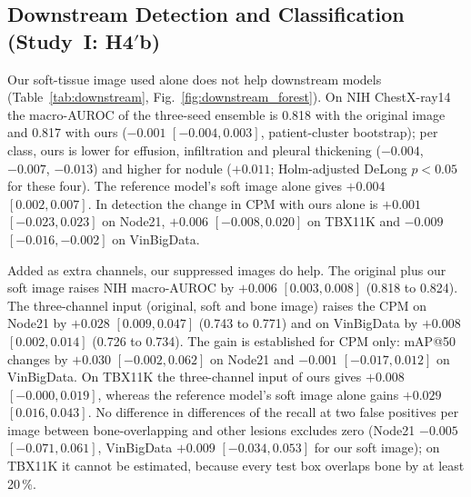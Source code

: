 \begin{table}[!t]
\centering
\caption{Contrast-to-noise change of real nodules on JSRT and Node21 (soft-tissue image minus original), all lesions and lesions with at
least 15\,\% bone overlap; image-cluster bootstrap intervals.}
\label{tab:cnr}
\end{table}

\subsection{Downstream Detection and Classification (Study~I: H4\texorpdfstring{$'$}{'}b)}
\label{sec:res-downstream}
Our soft-tissue image used alone does not help downstream models (Table~\ref{tab:downstream}, Fig.~\ref{fig:downstream_forest}). On
NIH ChestX-ray14 the macro-AUROC of the three-seed ensemble is 0.818 with the original image and 0.817 with ours ($-0.001$
$[-0.004,0.003]$, patient-cluster bootstrap); per class, ours is lower for effusion, infiltration and pleural thickening ($-0.004$,
$-0.007$, $-0.013$) and higher for nodule ($+0.011$; Holm-adjusted DeLong $p<0.05$ for these four). The reference model's soft image alone
gives $+0.004$ $[0.002,0.007]$. In detection the change in CPM with ours alone is $+0.001$ $[-0.023,0.023]$ on Node21, $+0.006$
$[-0.008,0.020]$ on TBX11K and $-0.009$ $[-0.016,-0.002]$ on VinBigData.

Added as extra channels, our suppressed images do help. The original plus our soft image raises NIH macro-AUROC by $+0.006$
$[0.003,0.008]$ (0.818 to 0.824). The three-channel input (original, soft and bone image) raises the CPM on Node21 by $+0.028$
$[0.009,0.047]$ (0.743 to 0.771) and on VinBigData by $+0.008$ $[0.002,0.014]$ (0.726 to 0.734). The gain is established for CPM only:
mAP@50 changes by $+0.030$ $[-0.002,0.062]$ on Node21 and $-0.001$ $[-0.017,0.012]$ on VinBigData. On TBX11K the three-channel input of ours
gives $+0.008$ $[-0.000,0.019]$, whereas the reference model's soft image alone gains $+0.029$ $[0.016,0.043]$. No difference in differences
of the recall at two false positives per image between bone-overlapping and other lesions excludes zero (Node21 $-0.005$ $[-0.071,0.061]$,
VinBigData $+0.009$ $[-0.034,0.053]$ for our soft image); on TBX11K it cannot be estimated, because every test box overlaps bone by at least
20\,\%.

